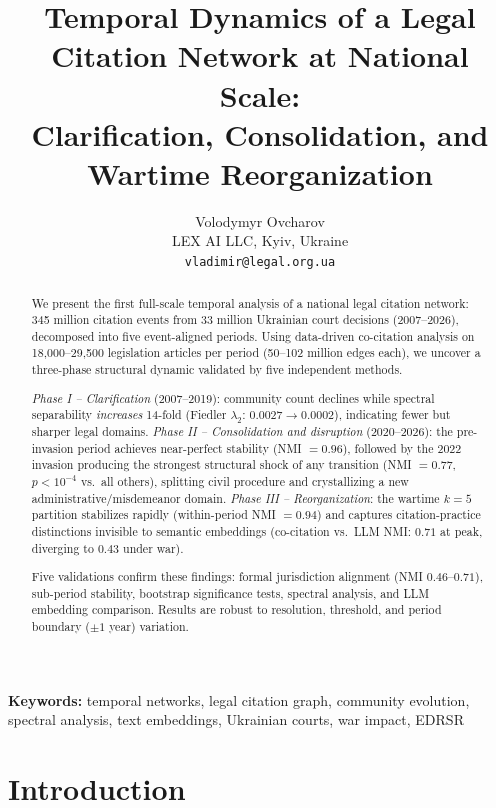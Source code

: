 \documentclass[11pt]{article}
\title{Temporal Dynamics of a Legal Citation Network at National Scale:\\
Clarification, Consolidation, and Wartime Reorganization}
\author{
  Volodymyr Ovcharov \\[6pt]
  LEX AI LLC, Kyiv, Ukraine \\[4pt]
  \texttt{vladimir@legal.org.ua}
}
\date{}
\begin{document}
\maketitle

\begin{abstract}

We present the first full-scale temporal analysis of a national legal citation network: 345 million citation events from 33 million Ukrainian court decisions (2007--2026), decomposed into five event-aligned periods.
Using data-driven co-citation analysis on 18{,}000--29{,}500 legislation articles per period (50--102 million edges each), we uncover a three-phase structural dynamic validated by five independent methods.

\emph{Phase I -- Clarification} (2007--2019): community count declines while spectral separability \emph{increases} 14-fold (Fiedler $\lambda_2$: $0.0027 \to 0.0002$), indicating fewer but sharper legal domains.
\emph{Phase II -- Consolidation and disruption} (2020--2026): the pre-invasion period achieves near-perfect stability (NMI $= 0.96$), followed by the 2022 invasion producing the strongest structural shock of any transition (NMI $= 0.77$, $p < 10^{-4}$ vs.\ all others), splitting civil procedure and crystallizing a new administrative/misdemeanor domain.
\emph{Phase III -- Reorganization}: the wartime $k = 5$ partition stabilizes rapidly (within-period NMI $= 0.94$) and captures citation-practice distinctions invisible to semantic embeddings (co-citation vs.\ LLM NMI: $0.71$ at peak, diverging to $0.43$ under war).

Five validations confirm these findings: formal jurisdiction alignment (NMI $0.46$--$0.71$), sub-period stability, bootstrap significance tests, spectral analysis, and LLM embedding comparison.
Results are robust to resolution, threshold, and period boundary ($\pm 1$ year) variation.

\end{abstract}

\medskip
\noindent\textbf{Keywords:} temporal networks, legal citation graph, community evolution, spectral analysis, text embeddings, Ukrainian courts, war impact, EDRSR

\section{Introduction}
\label{sec:intro}
\end{document}
